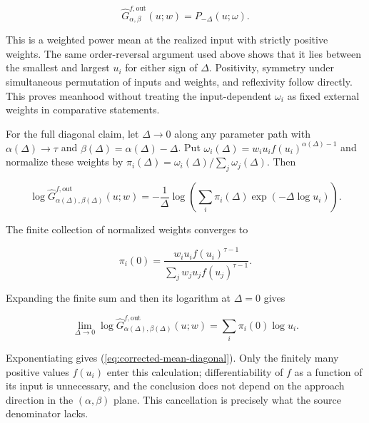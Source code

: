 \documentclass[12pt,a4paper,oneside]{report}
\begin{document}
\begin{equation}
  \widehat G_{\alpha,\beta}^{f,\mathrm{out}}(u;w)
  =P_{-\Delta}(u;\omega).
  \label{eq:appendix-corrected-power}
\end{equation}

This is a weighted power mean at the realized input with strictly positive
weights. The same order-reversal argument used above shows that it lies
between the smallest and largest $u_i$ for either sign of $\Delta$.
Positivity, symmetry under simultaneous permutation of inputs and weights, and
reflexivity follow directly. This proves meanhood without treating the
input-dependent $\omega_i$ as fixed external weights in comparative
statements.

For the full diagonal claim, let $\Delta\to0$ along any parameter path with
$\alpha(\Delta)\to\tau$ and
$\beta(\Delta)=\alpha(\Delta)-\Delta$. Put
$\omega_i(\Delta)=w_i u_i f(u_i)^{\alpha(\Delta)-1}$ and normalize these
weights by
$\pi_i(\Delta)=\omega_i(\Delta)/\sum_j\omega_j(\Delta)$. Then

\begin{equation}
  \log\widehat G_{\alpha(\Delta),\beta(\Delta)}^{f,\mathrm{out}}(u;w)
  =-\frac{1}{\Delta}\log\left(
    \sum_i\pi_i(\Delta)\exp(-\Delta\log u_i)
  \right).
  \label{eq:appendix-corrected-diagonal-path}
\end{equation}

The finite collection of normalized weights converges to

\begin{equation}
  \pi_i(0)=
  \frac{w_i u_i f(u_i)^{\tau-1}}
       {\sum_j w_j u_j f(u_j)^{\tau-1}}.
  \label{eq:corrected-limit-weights}
\end{equation}

Expanding the finite sum and then its logarithm at $\Delta=0$ gives

\begin{equation}
  \lim_{\Delta\to0}
  \log\widehat G_{\alpha(\Delta),\beta(\Delta)}^{f,\mathrm{out}}(u;w)
  =\sum_i\pi_i(0)\log u_i.
  \label{eq:appendix-corrected-diagonal-limit}
\end{equation}

Exponentiating gives (\ref{eq:corrected-mean-diagonal}). Only the finitely many
positive values $f(u_i)$ enter this calculation; differentiability of $f$ as
a function of its input is unnecessary, and the conclusion does not depend on
the approach direction in the $(\alpha,\beta)$ plane. This cancellation is
precisely what the source denominator lacks.
\end{document}
